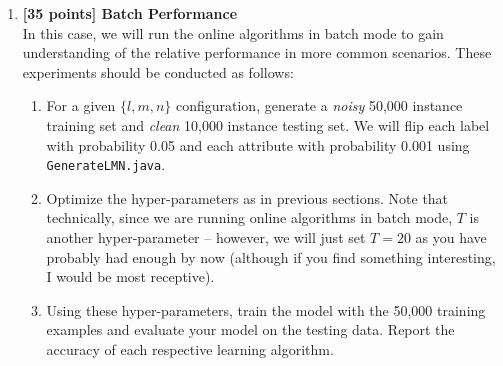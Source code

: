 \documentclass[12pt,letterpaper]{article}
\begin{document}
\begin{enumerate}
\begin{enumerate}
\begin{enumerate}
\item
Present an example to the learning algorithm.
\item
Again, keep track of the number of mistakes, $M$, the algorithm makes.
\end{enumerate}

The way we will measure convergence is that we will let the algorithm run until $S$ consecutive examples are presented such that no mistakes are made (i.e, the current hypothesis {\em survives} for 1000 instances).  Note that we are able to do this since we know that the algorithms can learn the target function.  Once $S$ instances are encountered, record $M$ at this point and halt.  For each algorithm, plot a curve of $M$ (on the $y$-axis) as a function of $n$ (on the $x$-axis) such that there are four curves, each determined by the five points associated with each value of $n$, on a single plot.

Note that you may have to play a bit with the value of $S$.  I would use $S=1000$ as a good starting point.  However, if this is too large such that the algorithm does not halt before $N=50,000$, you may have to lower this value.  Note that you must use the same value of $S$ for all experiments for valid  comparisons.

%
\item
{\bf [35 points] Batch Performance}\\

In this case, we will run the online algorithms in batch mode to gain understanding of the relative performance in more common scenarios.  These experiments should be conducted as follows:

\begin{enumerate}

\item
For a given $\{l,m,n\}$ configuration, generate a {\em noisy} 50,000 instance training set and {\em clean} 10,000 instance testing set.  We will flip each label with probability 0.05 and each attribute with probability 0.001 using {\tt GenerateLMN.java}.
\item
Optimize the hyper-parameters as in previous sections.  Note that technically, since we are running online algorithms in batch mode, $T$ is another hyper-parameter -- however, we will just set $T=20$ as you have probably had enough by now (although if you find something interesting, I would be most receptive).
\item
Using these hyper-parameters, train the model with the 50,000 training examples and evaluate your model on the testing data.  Report the accuracy of each respective learning algorithm.
\end{enumerate}


\end{enumerate}
\end{enumerate}
\end{document}
